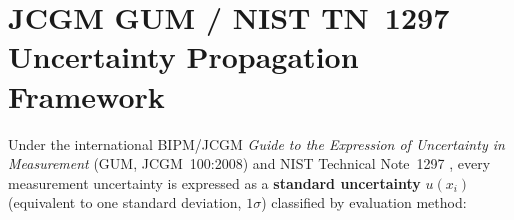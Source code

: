 \section{JCGM GUM / NIST TN~1297 Uncertainty Propagation Framework }\label{sec:17.6}

Under the international BIPM/JCGM \emph{Guide to the Expression of Uncertainty in Measurement} (GUM, JCGM~100:2008) and NIST Technical Note~1297 , every measurement uncertainty is expressed as a \textbf{standard uncertainty} $u(x_i)$ (equivalent to one standard deviation, $1\sigma$) classified by evaluation method:

